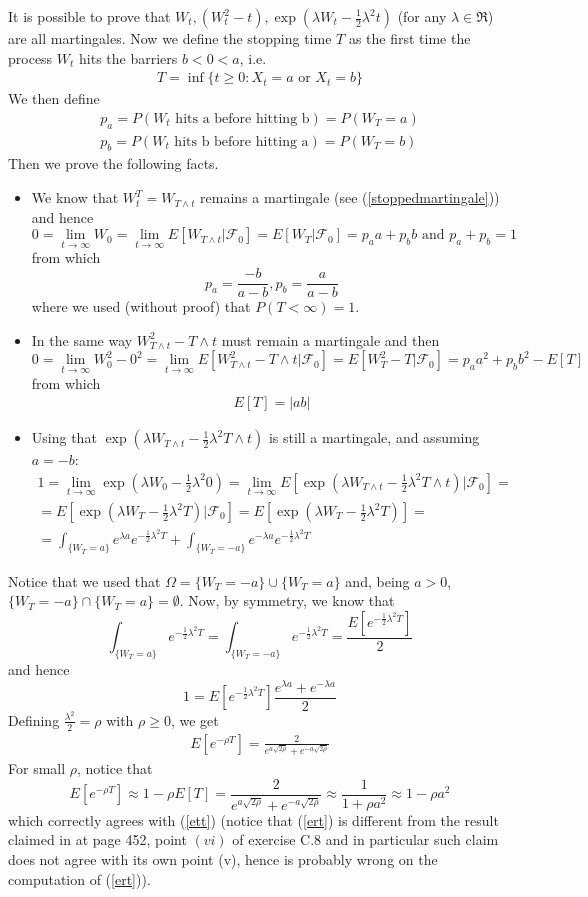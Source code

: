 \documentclass[a4paper,10pt]{report}
\theoremstyle{plain}
\theoremstyle{definition}
\newcommand\be{\begin{eqnarray}}    %
\newcommand\ee{\end{eqnarray}}
\newcommand{\FF} {\mathcal{F} }
\begin{document}
It is possible to prove that $W_t, (W_t^2-t), \exp(\lambda W_t-\frac{1}{2}\lambda^2 t)$ (for any $\lambda\in \Re$) are all martingales.
Now we define the stopping time $T$ as the first time the process $W_t$ hits the barriers $b<0<a$, i.e. 
\be 
T=\inf\{t\geq 0: X_t=a\mbox{ or } X_t=b\}
\ee
We then define 
\be
p_a=P(\mbox{$W_t$ hits a before hitting b})=P(W_T=a)\\
p_b=P(\mbox{$W_t$ hits b before hitting a})=P(W_T=b)
\ee
Then we prove the following facts.
\begin{itemize}
\item We know that $W_t^T=W_{T\wedge t}$ remains a martingale (see (\ref{stoppedmartingale})) and hence 
\[
0=\lim_{t\rightarrow \infty} W_0 = \lim_{t\rightarrow \infty} E[W_{T\wedge t}|\FF_0]=E[W_T|\FF_0]=p_a a + p_b b \mbox{ and } p_a+p_b=1
\]
from which 
\[
p_a = \frac{-b}{a-b}, p_b = \frac{a}{a-b}
\]
where we used (without proof) that $P(T<\infty)=1$.
\item In the same way $W_{T\wedge t}^2-{T\wedge t}$ must remain a martingale and then 
\[
0=\lim_{t\rightarrow \infty} W_0^2-0^2=\lim_{t\rightarrow \infty} E[W_{T\wedge t}^2-{T\wedge t}|\FF_0]=E[W_{T}^2-{T}|\FF_0]=p_a a^2 + p_b b^2 - E[T]
\]
from which
\be
E[T]=|ab|
\label{ett}
\ee
\item Using that $\exp(\lambda W_{T\wedge t}-\frac{1}{2}\lambda^2 {T\wedge t})$ is still a martingale, and assuming $a=-b$: 
\be
1=\lim_{t\rightarrow \infty} \exp\left(\lambda W_{0}-\frac{1}{2}\lambda^2 0\right)=\lim_{t\rightarrow \infty} E\left[\exp\left(\lambda W_{T\wedge t}-\frac{1}{2}\lambda^2 {T\wedge t}\right)|\FF_0\right]=\\
=E\left[\exp\left(\lambda W_{T}-\frac{1}{2}\lambda^2 {T}\right)|\FF_0\right]=E\left[\exp\left(\lambda W_{T}-\frac{1}{2}\lambda^2 {T}\right)\right]=\\
=\int_{\{W_T=a\}}e^{\lambda a} e^{-\frac{1}{2}\lambda^2 {T}}+\int_{\{W_T=-a\}}e^{-\lambda a} e^{-\frac{1}{2}\lambda^2 {T}}
\ee
\end{itemize}
Notice that we used that $\Omega = \{W_T=-a\} \cup \{W_T=a\}$ and, being $a>0$, $ \{W_T=-a\} \cap \{W_T=a\}=\emptyset$.
Now, by symmetry, we know that 
\[
\int_{\{W_T=a\}} e^{-\frac{1}{2}\lambda^2 {T}}=\int_{\{W_T=-a\}}e^{-\frac{1}{2}\lambda^2 {T}}=\frac{E[e^{-\frac{1}{2}\lambda^2 {T}}]}{2}
\]
and hence 
\[
1=E[e^{-\frac{1}{2}\lambda^2 {T}}] \frac{e^{\lambda a}+e^{-\lambda a}}{2}
\]
Defining $\frac{\lambda^2}{2}=\rho$ with $\rho\geq 0$, we get
\be
E[e^{-\rho T}]=\frac{2}{e^{a\sqrt{2\rho}}+e^{-a\sqrt{2\rho}}}
\label{ert}
\ee
For small $\rho$, notice that 
\[
E[e^{-\rho T}]\approx 1 - \rho E[T]=\frac{2}{e^{a\sqrt{2\rho}}+e^{-a\sqrt{2\rho}}}\approx \frac{1}{1+\rho a^2}\approx 1 - \rho a^2
\]
which correctly agrees with (\ref{ett}) (notice that (\ref{ert}) is different from the result claimed in \cite{Bjork} at page 452, point $(vi)$ of exercise C.8 and in particular such claim does not agree with its own point (v), hence \cite{Bjork} is probably wrong on the computation of (\ref{ert})).
\end{document}
